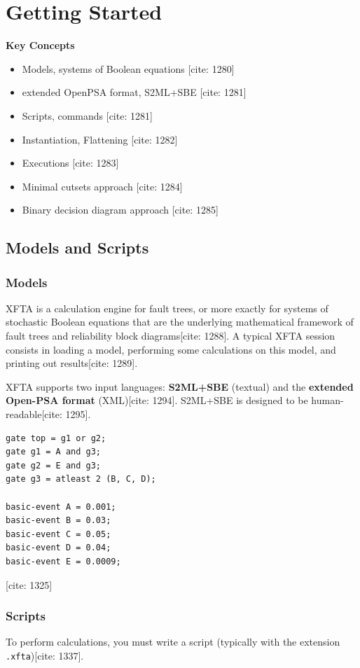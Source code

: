 

\chapter{Getting Started}

\textbf{Key Concepts}
\begin{itemize}
    \item Models, systems of Boolean equations [cite: 1280]
    \item extended OpenPSA format, S2ML+SBE [cite: 1281]
    \item Scripts, commands [cite: 1281]
    \item Instantiation, Flattening [cite: 1282]
    \item Executions [cite: 1283]
    \item Minimal cutsets approach [cite: 1284]
    \item Binary decision diagram approach [cite: 1285]
\end{itemize}

\section{Models and Scripts}

\subsection{Models}
XFTA is a calculation engine for fault trees, or more exactly for systems of stochastic Boolean equations that are the underlying mathematical framework of fault trees and reliability block diagrams[cite: 1288]. A typical XFTA session consists in loading a model, performing some calculations on this model, and printing out results[cite: 1289].

XFTA supports two input languages: \textbf{S2ML+SBE} (textual) and the \textbf{extended Open-PSA format} (XML)[cite: 1294]. S2ML+SBE is designed to be human-readable[cite: 1295].

\begin{lstlisting}[caption={S2ML+SBE code for a simple fault tree}]
gate top = g1 or g2;
gate g1 = A and g3;
gate g2 = E and g3;
gate g3 = atleast 2 (B, C, D);

basic-event A = 0.001;
basic-event B = 0.03;
basic-event C = 0.05;
basic-event D = 0.04;
basic-event E = 0.0009;
\end{lstlisting}
[cite: 1325]

\subsection{Scripts}
To perform calculations, you must write a script (typically with the extension \texttt{.xfta})[cite: 1337]. 

